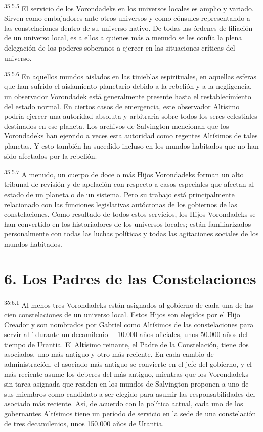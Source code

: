 \par
\textsuperscript{35:5.5} El servicio de los Vorondadeks en los universos locales es amplio y variado. Sirven como embajadores ante otros universos y como cónsules representando a las constelaciones dentro de su universo nativo. De todas las órdenes de filiación de un universo local, es a ellos a quienes más a menudo se les confía la plena delegación de los poderes soberanos a ejercer en las situaciones críticas del universo.

\par
\textsuperscript{35:5.6} En aquellos mundos aislados en las tinieblas espirituales, en aquellas esferas que han sufrido el aislamiento planetario debido a la rebelión y a la negligencia, un observador Vorondadek está generalmente presente hasta el restablecimiento del estado normal. En ciertos casos de emergencia, este observador Altísimo podría ejercer una autoridad absoluta y arbitraria sobre todos los seres celestiales destinados en ese planeta. Los archivos de Salvington mencionan que los Vorondadeks han ejercido a veces esta autoridad como regentes Altísimos de tales planetas. Y esto también ha sucedido incluso en los mundos habitados que no han sido afectados por la rebelión.

\par
\textsuperscript{35:5.7} A menudo, un cuerpo de doce o más Hijos Vorondadeks forman un alto tribunal de revisión y de apelación con respecto a casos especiales que afectan al estado de un planeta o de un sistema. Pero su trabajo está principalmente relacionado con las funciones legislativas autóctonas de los gobiernos de las constelaciones. Como resultado de todos estos servicios, los Hijos Vorondadeks se han convertido en los historiadores de los universos locales; están familiarizados personalmente con todas las luchas políticas y todas las agitaciones sociales de los mundos habitados.

\section*{6. Los Padres de las Constelaciones}
\par
\textsuperscript{35:6.1} Al menos tres Vorondadeks están asignados al gobierno de cada una de las cien constelaciones de un universo local. Estos Hijos son elegidos por el Hijo Creador y son nombrados por Gabriel como Altísimos de las constelaciones para servir allí durante un decamilenio ---10.000 años oficiales, unos 50.000 años del tiempo de Urantia. El Altísimo reinante, el Padre de la Constelación, tiene dos asociados, uno más antiguo y otro más reciente. En cada cambio de administración, el asociado más antiguo se convierte en el jefe del gobierno, y el más reciente asume los deberes del más antiguo, mientras que los Vorondadeks sin tarea asignada que residen en los mundos de Salvington proponen a uno de sus miembros como candidato a ser elegido para asumir las responsabilidades del asociado más reciente. Así, de acuerdo con la política actual, cada uno de los gobernantes Altísimos tiene un período de servicio en la sede de una constelación de tres decamilenios, unos
150.000 años de Urantia.

